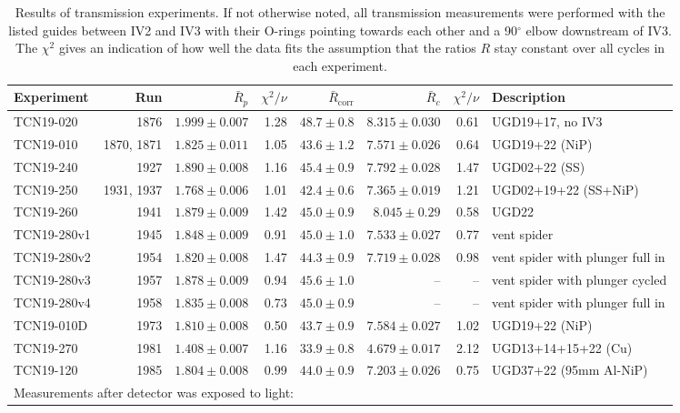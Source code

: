 \documentclass[10pt,letterpaper]{article}
\begin{document}
\begin{table}
\centering
\caption{Results of transmission experiments. If not otherwise noted, all transmission measurements were performed with the listed guides between IV2 and IV3 with their O-rings pointing towards each other and a 90$^\circ$ elbow downstream of IV3. The $\chi^2$ gives an indication of how well the data fits the assumption that the ratios $R$ stay constant over all cycles in each experiment.}
\begin{tabular}{l r r r r r r l}
\toprule
Experiment & Run & $\bar{R}_p$ & $\chi^2/\nu$ & $\bar{R}_\mathrm{corr}$ & $\bar{R}_c$ & $\chi^2/\nu$ & Description \\
\midrule
TCN19-020 & 1876 & $1.999 \pm 0.007$ & 1.28 & $48.7 \pm 0.8$ & $8.315 \pm 0.030$ & 0.61 & UGD19+17, no IV3 \\
TCN19-010 & 1870, 1871 & $1.825 \pm 0.011$ & 1.05 & $43.6 \pm 1.2$ & $7.571 \pm 0.026$ & 0.64 & UGD19+22 (NiP) \\
TCN19-240 & 1927 & $1.890 \pm 0.008$ & 1.16 & $45.4 \pm 0.9$ & $7.792 \pm 0.028$ & 1.47 & UGD02+22 (SS) \\
TCN19-250 & 1931, 1937 & $1.768 \pm 0.006$ & 1.01 & $42.4 \pm 0.6$ & $7.365 \pm 0.019$ & 1.21 & UGD02+19+22 (SS+NiP) \\
TCN19-260 & 1941 & $1.879 \pm 0.009$ & 1.42 & $45.0 \pm 0.9$ & $8.045 \pm 0.29$ & 0.58 & UGD22 \\
TCN19-280v1 & 1945 & $1.848 \pm 0.009$ & 0.91 & $45.0 \pm 1.0$ & $7.533 \pm 0.027$ & 0.77 & vent spider \\
TCN19-280v2 & 1954 & $1.820 \pm 0.008$ & 1.47 & $44.3 \pm 0.9$ & $7.719 \pm 0.028$ & 0.98 & vent spider with plunger full in \\
TCN19-280v3 & 1957 & $1.878 \pm 0.009$ & 0.94 & $45.6 \pm 1.0$ & -- & -- & vent spider with plunger cycled \\
TCN19-280v4 & 1958 & $1.835 \pm 0.008$ & 0.73 & $45.0 \pm 0.9$ & -- & -- & vent spider with plunger full in \\
TCN19-010D & 1973 & $1.810 \pm 0.008$ & 0.50 & $43.7 \pm 0.9$ & $7.584 \pm 0.027$ & 1.02 & UGD19+22 (NiP) \\
TCN19-270 & 1981 & $1.408 \pm 0.007$ & 1.16 & $33.9 \pm 0.8$ & $4.679 \pm 0.017$ & 2.12 & UGD13+14+15+22 (Cu) \\
TCN19-120 & 1985 & $1.804 \pm 0.008$ & 0.99 & $44.0 \pm 0.9$ & $7.203 \pm 0.026$ & 0.75 & UGD37+22 (95mm Al-NiP) \\
\midrule
\multicolumn{8}{l}{Measurements after detector was exposed to light:} \\ 

\end{tabular}
\end{table}
\end{document}
